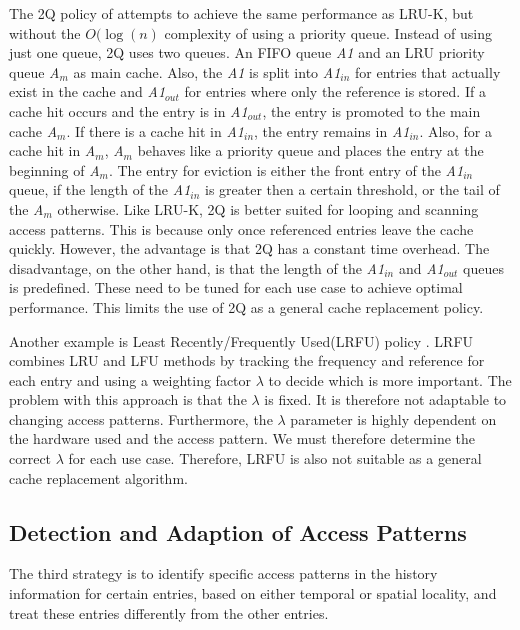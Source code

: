\documentclass[
	12pt,
	a4paper,
	abstract,
	bibliography=totoc,
	chapterprefix,
	headings=openright,
	numbers=endperiod,
	parskip=half,
	twoside,
]{scrreprt}
\begin{document}
The 2Q policy of \cite{shasha19942q} attempts to achieve the same performance as LRU-K, 
but without the $O(\log(n)$ complexity of using a priority queue.
Instead of using just one queue, 2Q uses two queues.
An FIFO queue \emph{A1} and an LRU priority queue \emph{A$_m$} as main cache.
Also, the \emph{A1} is split into \emph{A1$_{in}$} for entries that actually exist in the cache and \emph{A1$_{out}$} 
for entries where only the reference is stored.
If a cache hit occurs and the entry is in \emph{A1$_{out}$}, the entry is promoted to the main cache \emph{A$_m$}.
If there is a cache hit in \emph{A1$_{in}$}, the entry remains in \emph{A1$_{in}$}.
Also, for a cache hit in \emph{A$_m$}, \emph{A$_m$} behaves like a priority queue and places the entry at the beginning of \emph{A$_m$}.
The entry for eviction is either the front entry of the \emph{A1$_{in}$} queue, if the length of the \emph{A1$_{in}$} 
is greater then a certain threshold, or the tail of the 
\emph{A$_m$} otherwise.
Like LRU-K, 2Q is better suited for looping and scanning access patterns.
This is because only once referenced entries leave the cache quickly.
However, the advantage is that 2Q has a constant time overhead.
The disadvantage, on the other hand, is that the 
length of the \emph{A1$_{in}$} and \emph{A1$_{out}$} queues is predefined.
These need to be tuned for each use case to achieve optimal performance.
This limits the use of 2Q as a general cache replacement policy.

Another example is Least Recently/Frequently Used(LRFU) policy \cite{lee2001lrfu}.
LRFU combines LRU and LFU methods by tracking the frequency and reference for each entry and using a weighting factor $\lambda$ 
to decide which is more important.
The problem with this approach is that the $\lambda$ is fixed.
It is therefore not adaptable to changing access patterns.
Furthermore, the $\lambda$ parameter is highly dependent on the hardware used and the access pattern.
We must therefore determine the correct $\lambda$ for each use case.
Therefore, LRFU is also not suitable as a general cache replacement algorithm.

\subsection{Detection and Adaption of Access Patterns}

The third strategy is to identify specific access patterns in the history information for certain entries, 
based on either temporal or spatial locality, and treat these entries differently from the other entries.
\end{document}

